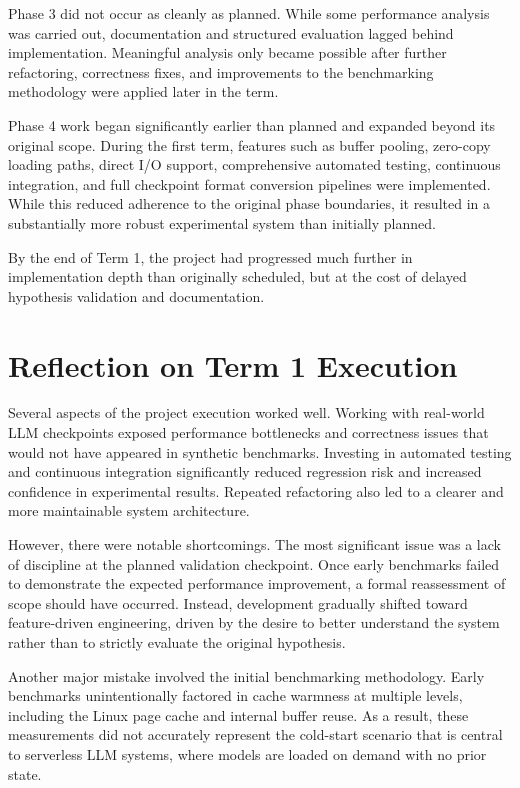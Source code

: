 \documentclass{article}
\begin{document}
Phase 3 did not occur as cleanly as planned. While some performance analysis was carried out, documentation and structured evaluation lagged behind implementation. Meaningful analysis only became possible after further refactoring, correctness fixes, and improvements to the benchmarking methodology were applied later in the term.

Phase 4 work began significantly earlier than planned and expanded beyond its original scope. During the first term, features such as buffer pooling, zero-copy loading paths, direct I/O support, comprehensive automated testing, continuous integration, and full checkpoint format conversion pipelines were implemented. While this reduced adherence to the original phase boundaries, it resulted in a substantially more robust experimental system than initially planned.

By the end of Term 1, the project had progressed much further in implementation depth than originally scheduled, but at the cost of delayed hypothesis validation and documentation.

\section{Reflection on Term 1 Execution}

Several aspects of the project execution worked well. Working with real-world LLM checkpoints exposed performance bottlenecks and correctness issues that would not have appeared in synthetic benchmarks. Investing in automated testing and continuous integration significantly reduced regression risk and increased confidence in experimental results. Repeated refactoring also led to a clearer and more maintainable system architecture.

However, there were notable shortcomings. The most significant issue was a lack of discipline at the planned validation checkpoint. Once early benchmarks failed to demonstrate the expected performance improvement, a formal reassessment of scope should have occurred. Instead, development gradually shifted toward feature-driven engineering, driven by the desire to better understand the system rather than to strictly evaluate the original hypothesis.

Another major mistake involved the initial benchmarking methodology. Early benchmarks unintentionally factored in cache warmness at multiple levels, including the Linux page cache and internal buffer reuse. As a result, these measurements did not accurately represent the cold-start scenario that is central to serverless LLM systems, where models are loaded on demand with no prior state.
\end{document}
